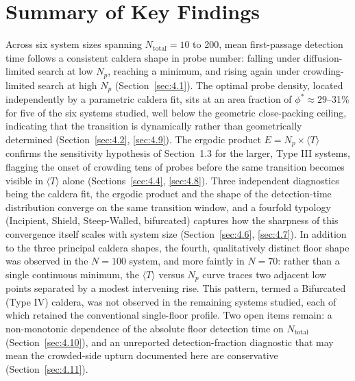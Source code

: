 \section{Summary of Key Findings}
\label{sec:4.12}
Across six system sizes spanning $N_\text{total} =10$ to 200, mean first-passage detection time follows a consistent caldera shape in probe number: falling under diffusion-limited search at low $N_p$, reaching a minimum, and rising again under crowding-limited search at high $N_p$ (Section~\ref{sec:4.1}). The optimal probe density, located independently by a parametric caldera fit, sits at an area fraction of $\phi^* \approx 29$--31\% for five of the six systems studied, well below the geometric close-packing ceiling, indicating that the transition is dynamically rather than geometrically determined (Section~\ref{sec:4.2}, \ref{sec:4.9}). The ergodic product $E = N_p \times \langle T \rangle$ confirms the sensitivity hypothesis of Section~1.3 for the larger, Type III systems, flagging the onset of crowding tens of probes before the same transition becomes visible in $\langle T \rangle$ alone (Sections~\ref{sec:4.4}, \ref{sec:4.8}). Three independent diagnostics being the caldera fit, the ergodic product and the shape of the detection-time distribution converge on the same transition window, and a fourfold typology (Incipient, Shield, Steep-Walled, bifurcated) captures how the sharpness of this convergence itself scales with system size (Section~\ref{sec:4.6}, \ref{sec:4.7}). In addition to the three principal caldera shapes, the fourth, qualitatively distinct floor shape was observed in the $N=100$ system, and more faintly in $N=70$: rather than a single continuous minimum, the $\langle T \rangle$ versus $N_p$ curve traces two adjacent low points separated by a modest intervening rise. This pattern, termed a Bifurcated (Type IV) caldera, was not observed in the remaining systems studied, each of which retained the conventional single-floor profile. Two open items remain: a non-monotonic dependence of the absolute floor detection time on $N_\text{total}$ (Section~\ref{sec:4.10}), and an unreported detection-fraction diagnostic that may mean the crowded-side upturn documented here are conservative (Section~\ref{sec:4.11}).